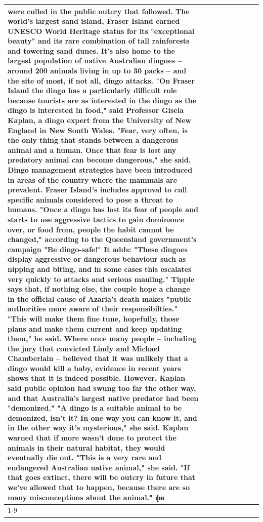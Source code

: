 \begin{table}[H]
\begin{tabular}{lllrlllll}
were culled in the public outcry that followed. The world's largest sand island, Fraser Island earned UNESCO World Heritage status for its "exceptional beauty" and its rare combination of tall rainforests and towering sand dunes. It's also home to the largest population of native Australian dingoes -- around 200 animals living in up to 30 packs -- and the site of most, if not all, dingo attacks. "On Fraser Island the dingo has a particularly difficult role because tourists are as interested in the dingo as the dingo is interested in food," said Professor Gisela Kaplan, a dingo expert from the University of New England in New South Wales. "Fear, very often, is the only thing that stands between a dangerous animal and a human. Once that fear is lost any predatory animal can become dangerous," she said. Dingo management strategies have been introduced in areas of the country where the mammals are prevalent. Fraser Island's includes approval to cull specific animals considered to pose a threat to humans. "Once a dingo has lost its fear of people and starts to use aggressive tactics to gain dominance over, or food from, people the habit cannot be changed," according to the Queensland government's campaign "Be dingo-safe!" It adds: "These dingoes display aggressive or dangerous behaviour such as nipping and biting, and in some cases this escalates very quickly to attacks and serious mauling." Tipple says that, if nothing else, the couple hope a change in the official cause of Azaria's death makes "public authorities more aware of their responsibilties." "This will make them fine tune, hopefully, those plans and make them current and keep updating them," he said. Where once many people -- including the jury that convicted Lindy and Michael Chamberlain -- believed that it was unlikely that a dingo would kill a baby, evidence in recent years shows that it is indeed possible. However, Kaplan said public opinion had swung too far the other way, and that Australia's largest native predator had been "demonized." "A dingo is a suitable animal to be demonized, isn't it? In one way you can know it, and in the other way it's mysterious," she said. Kaplan warned that if more wasn't done to protect the animals in their natural habitat, they would eventually die out. "This is a very rare and endangered Australian native animal," she said. "If that goes extinct, there will be outcry in future that we've allowed that to happen, because there are so many misconceptions about the animal." фи \\
\cline{1-9}

\end{tabular}
\end{table}
